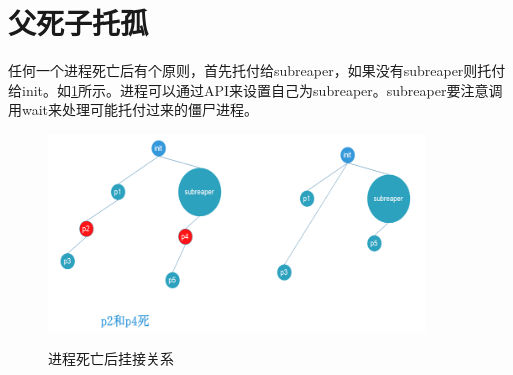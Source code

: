 \begin{tcolorbox}[colback=blue!5,colframe=blue!75!black,title=子进程死亡原因获取视频]
\end{tcolorbox}
\section{父死子托孤}
任何一个进程死亡后有个原则，首先托付给subreaper，如果没有subreaper则托付给init。如\ref{child_process_died}所示。进程可以通过API来设置自己为subreaper。subreaper要注意调用wait来处理可能托付过来的僵尸进程。
\begin{figure}[H]
 \wdfigbox
  {\caption{进程死亡后挂接关系}\label{child_process_died}}
  {
  \includegraphics[width=10cm]{./figure/child_process_died.png}
  }  
\end{figure}

\begin{tcolorbox}[colback=blue!5,colframe=blue!75!black,title=进程托孤视频]
\end{tcolorbox}
\clearpage

